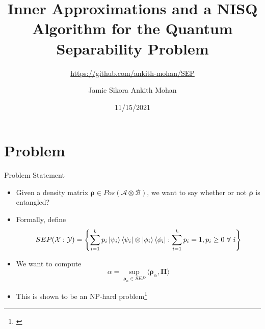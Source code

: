 \documentclass{beamer}
\title[SEP]{Inner Approximations and a NISQ Algorithm for the Quantum Separability Problem}
\subtitle{\url{https://github.com/ankith-mohan/SEP}}
\author{
    Jamie Sikora
    \And
    Ankith Mohan
}
\institute{
    Virginia Tech
}
\date{11/15/2021}
\newcommand{\snote}[1]{\textcolor{blue}{[*** Jamie : #1 ***]}}
\begin{document}
\frame{\titlepage}



\section{Problem}
    \begin{frame}{Problem Statement}
        \begin{itemize}
            \item[] Given a density matrix $\mathbf{\rho} \in Pos(\mathcal{A}\otimes\mathcal{B})$, we want to say whether or not $\mathbf{\rho}$ is entangled?
            \item[] Formally, define 
            $$
                SEP(\mathcal{X}:\mathcal{Y}) = \left\{\sum\limits_{i=1}^{k}p_{i}\ket{\psi_{i}}\bra{\psi_{i}} \otimes \ket{\phi_{i}}\bra{\phi_{i}}: \sum\limits_{i=1}^{k}p_{i} = 1, p_{i} \ge 0\ \forall\ i\right\}
            $$
            \item[] We want to compute
            $$
                \alpha = \sup\limits_{\mathbf{\rho}_{\alpha} \in SEP}\langle\mathbf{\rho}_{\alpha}, \mathbf{\Pi}\rangle
            $$
            \item[] This is shown to be an NP-hard problem\footnote{\cite{gurvits2004classical}}
        \end{itemize}
    \end{frame}    
    
\end{document}
